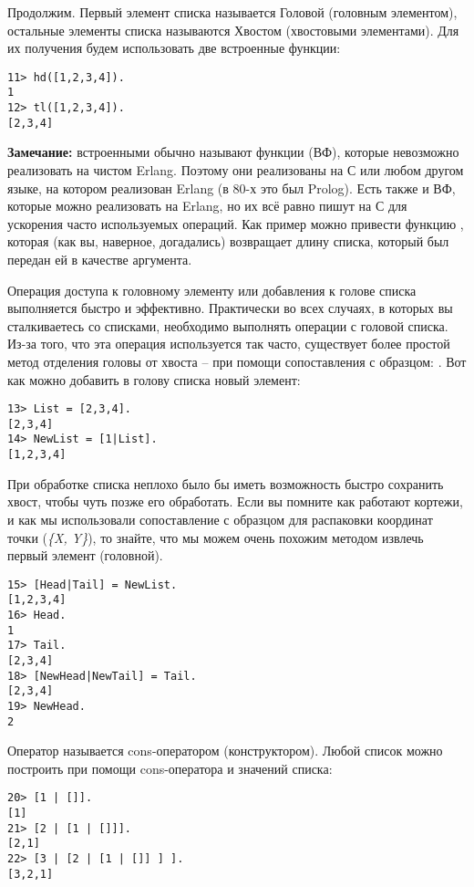Продолжим.
Первый элемент списка называется Головой (головным элементом), остальные элементы списка называются Хвостом (хвостовыми элементами).
Для их получения будем использовать две встроенные функции:
\begin{lstlisting}[style=repl]
11> hd([1,2,3,4]).
1
12> tl([1,2,3,4]).
[2,3,4]
\end{lstlisting}
\colorbox{lgray}
{
    \begin{minipage}{1.0\linewidth}
        \textbf{Замечание:} встроенными обычно называют функции (ВФ), которые невозможно реализовать на чистом Erlang.
        Поэтому они реализованы на С или любом другом языке, на котором реализован Erlang (в 80\--х это был Prolog).
        Есть также и ВФ, которые можно реализовать на Erlang, но их всё равно пишут на С для ускорения часто используемых операций.
        Как пример можно привести функцию , которая (как вы, наверное, догадались) возвращает длину списка, который был передан ей в качестве аргумента.
    \end{minipage}
}

Операция доступа к головному элементу или добавления к голове списка выполняется быстро и эффективно.
Практически во всех случаях, в которых вы сталкиваетесь со списками, необходимо выполнять операции с головой списка.
Из\--за того, что эта операция используется так часто, существует более простой метод отделения головы от хвоста \--- при помощи сопоставления с образцом: .
Вот как можно добавить в голову списка новый элемент:
\begin{lstlisting}[style=repl]
13> List = [2,3,4].
[2,3,4]
14> NewList = [1|List].
[1,2,3,4]
\end{lstlisting}

При обработке списка неплохо было бы иметь возможность быстро сохранить хвост, чтобы чуть позже его обработать.
Если вы помните как работают кортежи, и как мы использовали сопоставление с образцом для распаковки координат точки (\emph{\{X, Y\}}), то знайте, что мы можем очень похожим методом извлечь первый элемент (головной).
\begin{lstlisting}[style=repl]
15> [Head|Tail] = NewList.
[1,2,3,4]
16> Head.
1
17> Tail.
[2,3,4]
18> [NewHead|NewTail] = Tail.
[2,3,4]
19> NewHead.
2
\end{lstlisting}

Оператор \ops{|} называется cons\--оператором (конструктором).
Любой список можно построить при помощи cons\--оператора и значений списка:
\begin{lstlisting}[style=repl]
20> [1 | []].
[1]
21> [2 | [1 | []]].
[2,1]
22> [3 | [2 | [1 | []] ] ].
[3,2,1]
\end{lstlisting}

